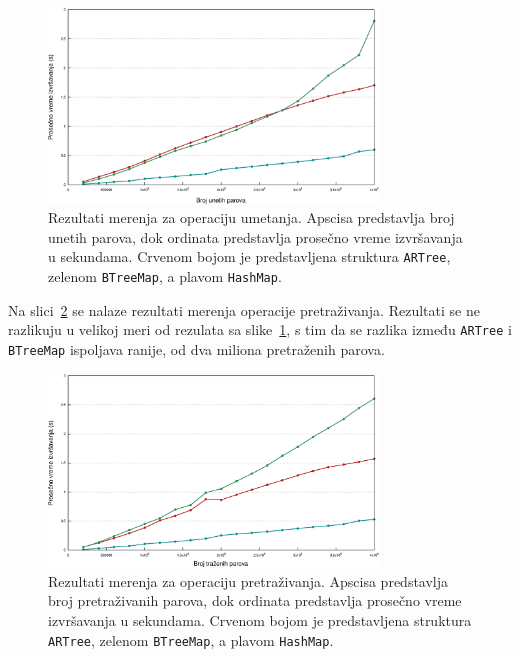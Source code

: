 \documentclass[12pt,oneside]{memoir}
\begin{document}
\begin{figure}[!h]
  \centering
  \includegraphics[width=0.78\textwidth]{lines_insert.eps}
  \caption{
    Rezultati merenja za operaciju umetanja. Apscisa predstavlja broj
    unetih parova, dok ordinata predstavlja prosečno vreme izvršavanja u sekundama.
    Crvenom bojom je predstavljena struktura
    \texttt{ARTree}, zelenom \texttt{BTreeMap}, a plavom \texttt{HashMap}.
  }
  \label{fig:bench_insert}
\end{figure}

Na slici~\ref{fig:bench_get} se nalaze rezultati merenja operacije
pretraživanja. Rezultati se ne razlikuju u velikoj meri od rezulata sa
slike~\ref{fig:bench_insert}, s tim da se razlika između \texttt{ARTree}
i \texttt{BTreeMap} ispoljava ranije, od dva miliona pretraženih
parova.

\begin{figure}[!h]
  \centering
  \includegraphics[width=0.78\textwidth]{lines_get.eps}
  \caption{
    Rezultati merenja za operaciju pretraživanja. Apscisa predstavlja broj
    pretraživanih parova, dok ordinata predstavlja prosečno vreme izvršavanja u sekundama.
    Crvenom bojom je predstavljena struktura
    \texttt{ARTree}, zelenom \texttt{BTreeMap}, a plavom \texttt{HashMap}.
  }
  \label{fig:bench_get}
\end{figure}
\end{document}
